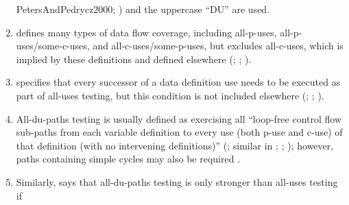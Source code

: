 \begin{enumerate}
{              PetersAndPedrycz2000}; \citealp[Fig.~2]{Reid1996}) and the
          uppercase ``DU'' \citep[p.~425]{vanVliet2000} are used.
    \item %
           defines many types of data
          flow coverage, including all-\acsp{p-use},
          all-\acsp{p-use}/some-\acsp{c-use}, and
          all-\acsp{c-use}/some-\acsp{p-use}, but
          excludes all-\acsp{c-use}, which is implied by these definitions and
          defined elsewhere (\citealp[p.~27]{IEEE2021c};
          \citeyear[p.~83]{IEEE2017}; \citealp[p.~479]{PetersAndPedrycz2000}).
    \item %
           specifies that every
          successor of a data definition use needs to be executed as part of
          all-uses testing, but this condition is not included elsewhere
          (\citealp[pp.~28\==29]{IEEE2021c}; \citeyear[p.~120]{IEEE2017};
          \citealp[pp.~478\==479]{PetersAndPedrycz2000}).
    \item %
          All-\acsp{du-path} testing is usually defined as exercising all
          ``loop-free control flow sub-paths from each variable definition to
          every use (both \acs{p-use} and \acs{c-use}) of that definition (with no
          intervening definitions)'' (\citealp[p.~29]{IEEE2021c}; similar in
          \citeyear[p.~125]{IEEE2017}; \citealp[p.~5\=/13]{SWEBOK2025};
          \citealp[p.~479]{PetersAndPedrycz2000}); however, paths containing
          simple cycles may also be required \citep[p.~425]{vanVliet2000}.
    \item %
          Similarly, \citet[pp.~432\==433]{vanVliet2000} says that
          all-\acsp{du-path} testing is only stronger than all-uses testing if

\end{enumerate}
